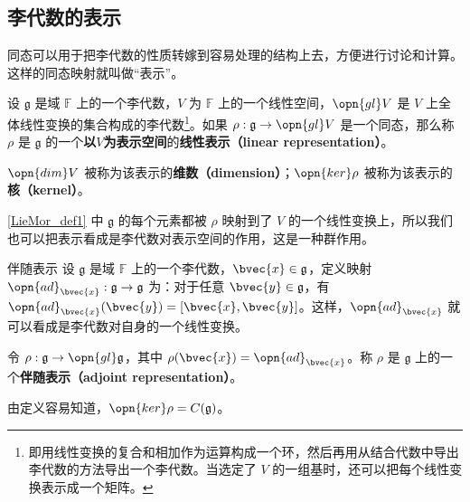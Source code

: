 \subsection{李代数的表示}

同态可以用于把李代数的性质转嫁到容易处理的结构上去，方便进行讨论和计算。这样的同态映射就叫做“表示”。

\begin{definition}{}\label{LieMor_def1}
设 $\mathfrak{g}$ 是域 $\mathbb{F}$ 上的一个李代数，$V$ 为 $\mathbb{F}$ 上的一个线性空间，$\opn{gl}V$ 是 $V$ 上全体线性变换的集合构成的李代数\footnote{即用线性变换的复合和相加作为运算构成一个环，然后再用从结合代数中导出李代数的方法导出一个李代数。当选定了 $V$ 的一组基时，还可以把每个线性变换表示成一个矩阵。}。如果 $\rho:\mathfrak{g}\to \opn{gl}V$ 是一个同态，那么称 $\rho$ 是 $\mathfrak{g}$ 的一个\textbf{以}$V$\textbf{为表示空间}的\textbf{线性表示（linear representation）}。

$\opn{dim} V$ 被称为该表示的\textbf{维数（dimension）}；$\opn{ker}\rho$ 被称为该表示的\textbf{核（kernel）}。
\end{definition}

\autoref{LieMor_def1} 中 $\mathfrak{g}$ 的每个元素都被 $\rho$ 映射到了 $V$ 的一个线性变换上，所以我们也可以把表示看成是李代数对表示空间的作用，这是一种群作用。



\begin{example}{伴随表示}
设 $\mathfrak{g}$ 是域 $\mathbb{F}$ 上的一个李代数，$\bvec{x}\in\mathfrak{g}$，定义映射 $\opn{ad}_{\bvec{x}} :\mathfrak{g}\to\mathfrak{g}$ 为：对于任意 $\bvec{y}\in\mathfrak{g}$，有 $\opn{ad}_{\bvec{x}}(\bvec{y})=[\bvec{x}, \bvec{y}]$。这样，$\opn{ad}_{\bvec{x}}$ 就可以看成是李代数对自身的一个线性变换。

令 $\rho:\mathfrak{g}\to\opn{gl}\mathfrak{g}$，其中 $\rho(\bvec{x})=\opn{ad}_{\bvec{x}}$。称 $\rho$ 是 $\mathfrak{g}$ 上的一个\textbf{伴随表示（adjoint representation）}。

由定义容易知道，$\opn{ker}\rho=C(\mathfrak{g})$。
\end{example}










